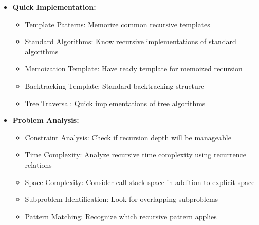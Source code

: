 \documentclass[a4paper,10pt]{book}
\begin{document}
\begin{itemize}[leftmargin=*]
    \item \textbf{Quick Implementation:}
    \begin{itemize}
        \item Template Patterns: Memorize common recursive templates
        \item Standard Algorithms: Know recursive implementations of standard algorithms
        \item Memoization Template: Have ready template for memoized recursion
        \item Backtracking Template: Standard backtracking structure
        \item Tree Traversal: Quick implementations of tree algorithms
    \end{itemize}

    \item \textbf{Problem Analysis:}
    \begin{itemize}
        \item Constraint Analysis: Check if recursion depth will be manageable
        \item Time Complexity: Analyze recursive time complexity using recurrence relations
        \item Space Complexity: Consider call stack space in addition to explicit space
        \item Subproblem Identification: Look for overlapping subproblems
        \item Pattern Matching: Recognize which recursive pattern applies
    \end{itemize}
\end{itemize}
\end{document}
